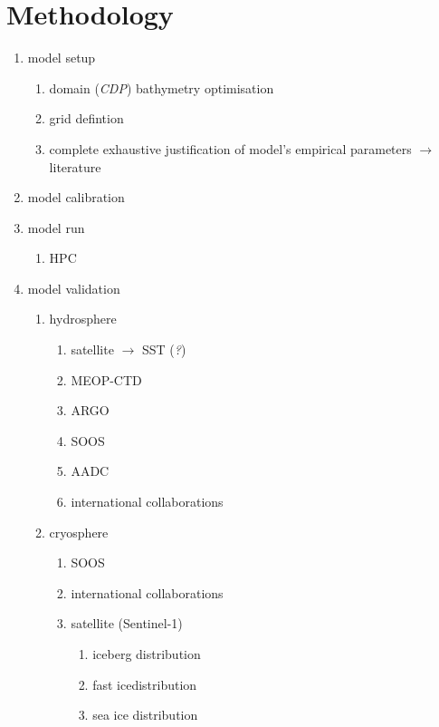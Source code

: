 \documentclass[11pt,a4paper]{article}
\newcommand{\fastice}{fast ice}
\newcommand{\cdp}{\textit{CDP}} %
\begin{document}
\section*{Methodology}
%
\begin{enumerate}
\item model setup
  \begin{enumerate}
  \item domain (\cdp) bathymetry optimisation
  \item grid defintion
  \item complete exhaustive justification of model's empirical parameters $\rightarrow$ literature
  \end{enumerate}
\item model calibration
\item model run
  \begin{enumerate}
  \item HPC
  \end{enumerate}
\item model validation
  \begin{enumerate}
  \item hydrosphere
    \begin{enumerate}
    \item satellite $\rightarrow$ SST (\textit{?})
    \item MEOP-CTD
    \item ARGO
    \item SOOS
    \item AADC
    \item international collaborations
    \end{enumerate}
    \item cryosphere
      \begin{enumerate}
      \item SOOS
      \item international collaborations
      \item satellite (Sentinel-1)
        \begin{enumerate}
        \item iceberg distribution
        \item \fastice distribution
        \item sea ice distribution
        \end{enumerate}
      \end{enumerate}
  \end{enumerate}
\end{enumerate}
\end{document}
